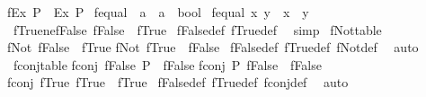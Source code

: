 \begin{isabellebody}
{\isachardoublequoteopen}fEx\ P\ {\isasymlongleftrightarrow}\ Ex\ P{\isachardoublequoteclose}\isanewline
\isanewline
{}\isamarkupfalse%
\ fequal\ {\isacharcolon}{\kern0pt}{\isacharcolon}{\kern0pt}\ {\isachardoublequoteopen}{\isacharprime}{\kern0pt}a\ {\isasymRightarrow}\ {\isacharprime}{\kern0pt}a\ {\isasymRightarrow}\ bool{\isachardoublequoteclose}\ \isanewline
{\isachardoublequoteopen}fequal\ x\ y\ {\isasymlongleftrightarrow}\ {\isacharparenleft}{\kern0pt}x\ {\isacharequal}{\kern0pt}\ y{\isacharparenright}{\kern0pt}{\isachardoublequoteclose}\isanewline
\isanewline
{}\isamarkupfalse%
\ fTrue{\isacharunderscore}{\kern0pt}ne{\isacharunderscore}{\kern0pt}fFalse{\isacharcolon}{\kern0pt}\ {\isachardoublequoteopen}fFalse\ {\isasymnoteq}\ fTrue{\isachardoublequoteclose}\isanewline
%
\isadelimproof
%
\endisadelimproof
%
\isatagproof
{}\isamarkupfalse%
\ fFalse{\isacharunderscore}{\kern0pt}def\ fTrue{\isacharunderscore}{\kern0pt}def\ \isamarkupfalse%
\ simp%
\endisatagproof
{\isafoldproof}%
%
\isadelimproof
\isanewline
%
\endisadelimproof
\isanewline
{}\isamarkupfalse%
\ fNot{\isacharunderscore}{\kern0pt}table{\isacharcolon}{\kern0pt}\isanewline
{\isachardoublequoteopen}fNot\ fFalse\ {\isacharequal}{\kern0pt}\ fTrue{\isachardoublequoteclose}\isanewline
{\isachardoublequoteopen}fNot\ fTrue\ {\isacharequal}{\kern0pt}\ fFalse{\isachardoublequoteclose}\isanewline
%
\isadelimproof
%
\endisadelimproof
%
\isatagproof
{}\isamarkupfalse%
\ fFalse{\isacharunderscore}{\kern0pt}def\ fTrue{\isacharunderscore}{\kern0pt}def\ fNot{\isacharunderscore}{\kern0pt}def\ \isamarkupfalse%
\ auto%
\endisatagproof
{\isafoldproof}%
%
\isadelimproof
\isanewline
%
\endisadelimproof
\isanewline
{}\isamarkupfalse%
\ fconj{\isacharunderscore}{\kern0pt}table{\isacharcolon}{\kern0pt}\isanewline
{\isachardoublequoteopen}fconj\ fFalse\ P\ {\isacharequal}{\kern0pt}\ fFalse{\isachardoublequoteclose}\isanewline
{\isachardoublequoteopen}fconj\ P\ fFalse\ {\isacharequal}{\kern0pt}\ fFalse{\isachardoublequoteclose}\isanewline
{\isachardoublequoteopen}fconj\ fTrue\ fTrue\ {\isacharequal}{\kern0pt}\ fTrue{\isachardoublequoteclose}\isanewline
%
\isadelimproof
%
\endisadelimproof
%
\isatagproof
{}\isamarkupfalse%
\ fFalse{\isacharunderscore}{\kern0pt}def\ fTrue{\isacharunderscore}{\kern0pt}def\ fconj{\isacharunderscore}{\kern0pt}def\ \isamarkupfalse%
\ auto%
\endisatagproof
{\isafoldproof}%
%
\isadelimproof
\isanewline

\end{isabellebody}
